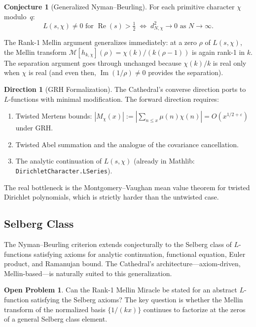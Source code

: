 \documentclass[11pt,a4paper]{article}
\theoremstyle{definition}
\newtheorem{conjecture}[definition]{Conjecture}
\newtheorem{open}[definition]{Open Problem}
\newtheorem{direction}[definition]{Direction}
\newcommand{\re}{\operatorname{Re}}
\newcommand{\im}{\operatorname{Im}}
\newcommand{\lean}[1]{\texttt{#1}}
\begin{document}
\begin{conjecture}[Generalized Nyman--Beurling]
For each primitive character $\chi$ modulo~$q$:
\[
  L(s,\chi) \neq 0 \text{ for } \re(s) > \tfrac{1}{2}
  \;\iff\;
  d_{N,\chi}^2 \to 0 \text{ as } N \to \infty.
\]
\end{conjecture}

The Rank-1 Mellin argument generalizes immediately: at a zero $\rho$ of
$L(s,\chi)$, the Mellin transform $\mathcal{M}[h_{k,\chi}](\rho) =
\chi(k)/(k(\rho-1))$ is again rank-1 in $k$. The separation argument
goes through unchanged because $\chi(k)/k$ is real only when $\chi$ is
real (and even then, $\im(1/\rho) \neq 0$ provides the separation).

\begin{direction}[GRH Formalization]
The Cathedral's converse direction ports to $L$-functions with minimal
modification. The forward direction requires:
\begin{enumerate}
  \item Twisted Mertens bounds: $|M_\chi(x)| := |\sum_{n \le x} \mu(n)\chi(n)|
    = O(x^{1/2+\varepsilon})$ under GRH.
  \item Twisted Abel summation and the analogue of the covariance cancellation.
  \item The analytic continuation of $L(s,\chi)$ (already in Mathlib:
    \lean{DirichletCharacter.LSeries}).
\end{enumerate}
The real bottleneck is the Montgomery--Vaughan mean value theorem for
twisted Dirichlet polynomials, which is strictly harder than the
untwisted case.
\end{direction}

\subsection{Selberg Class}

The Nyman--Beurling criterion extends conjecturally to the Selberg class
of $L$-functions satisfying axioms for analytic continuation, functional
equation, Euler product, and Ramanujan bound. The Cathedral's
architecture---axiom-driven, Mellin-based---is naturally suited to this
generalization.

\begin{open}
Can the Rank-1 Mellin Miracle be stated for an abstract $L$-function
satisfying the Selberg axioms? The key question is whether the Mellin
transform of the normalized basis $\{1/(kx)\}$ continues to factorize
at the zeros of a general Selberg class element.
\end{open}
\end{document}
